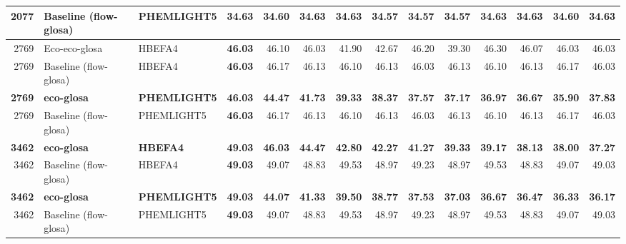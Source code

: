 \begin{table}[htb]
{\begin{tabular}{r l l r *{10}{r}}
    2077 & Baseline (\ac{flow-glosa})  & PHEMLIGHT5       & \textbf{34.63} & 34.60 & 34.63 & 34.63 & 34.57 & 34.57 & 34.57 & 34.63 & 34.63 & 34.60 & 34.63 \\
    \midrule
    2769 & Eco-\ac{eco-glosa}           & HBEFA4         & \textbf{46.03} & 46.10 & 46.03 & 41.90 & 42.67 & 46.20 & 39.30 & 46.30 & 46.07 & 46.03 & 46.03 \\
    2769 & Baseline (\ac{flow-glosa})   & HBEFA4         & \textbf{46.03} & 46.17 & 46.13 & 46.10 & 46.13 & 46.03 & 46.13 & 46.10 & 46.13 & 46.17 & 46.03 \\
    \textbf{2769} & \textbf{\ac{eco-glosa}} & \textbf{PHEMLIGHT5} & \textbf{46.03} & \textbf{44.47} & \textbf{41.73} & \textbf{39.33} & \textbf{38.37} & \textbf{37.57} & \textbf{37.17} & \textbf{36.97} & \textbf{36.67} & \textbf{35.90} & \textbf{37.83} \\
    2769 & Baseline (\ac{flow-glosa})  & PHEMLIGHT5       & \textbf{46.03} & 46.17 & 46.13 & 46.10 & 46.13 & 46.03 & 46.13 & 46.10 & 46.13 & 46.17 & 46.03 \\
    \midrule
    \textbf{3462} & \textbf{\ac{eco-glosa}} & \textbf{HBEFA4}   & \textbf{49.03} & \textbf{46.03} & \textbf{44.47} & \textbf{42.80} & \textbf{42.27} & \textbf{41.27} & \textbf{39.33} & \textbf{39.17} & \textbf{38.13} & \textbf{38.00} & \textbf{37.27} \\
    3462 & Baseline (\ac{flow-glosa})  & HBEFA4           & \textbf{49.03} & 49.07 & 48.83 & 49.53 & 48.97 & 49.23 & 48.97 & 49.53 & 48.83 & 49.07 & 49.03 \\
    \textbf{3462} & \textbf{\ac{eco-glosa}} & \textbf{PHEMLIGHT5} & \textbf{49.03} & \textbf{44.07} & \textbf{41.33} & \textbf{39.50} & \textbf{38.77} & \textbf{37.53} & \textbf{37.03} & \textbf{36.67} & \textbf{36.47} & \textbf{36.33} & \textbf{36.17} \\
    3462 & Baseline (\ac{flow-glosa})  & PHEMLIGHT5       & \textbf{49.03} & 49.07 & 48.83 & 49.53 & 48.97 & 49.23 & 48.97 & 49.53 & 48.83 & 49.07 & 49.03 \\
    \bottomrule
  \end{tabular}%
  }
\end{table}